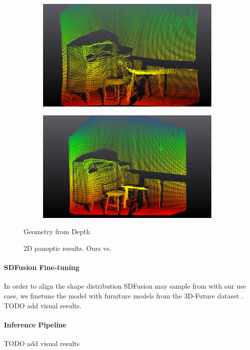 \begin{figure}[t]
  \vspace{0.04\linewidth} %

  \begin{subfigure}{0.45\linewidth}
    \centering
    \includegraphics[width=\linewidth]{figs/depthply_ours.png}
    \label{subfig:sub3}
  \end{subfigure}
  \hspace{0.05\linewidth} %
  \begin{subfigure}{0.45\linewidth}
    \centering
    \includegraphics[width=\linewidth]{figs/depthply_pan.png}
    \label{subfig:sub4}
  \end{subfigure}
   \vspace*{-3mm} %
   \caption*{Geometry from Depth}

  \caption{2D panoptic results. Ours vs. \citet{dahnert2021panoptic}}
  \label{fig:qual_panoptic}
\end{figure}

\paragraph{SDFusion Fine-tuning}
In order to align the shape distribution SDFusion \citep{cheng2023sdfusion} may sample from with our use case, we finetune the model with furniture models from the 3D-Future dataset \citep{fu20213e}. TODO add visual results.

\paragraph{Inference Pipeline}
TODO add visual results
